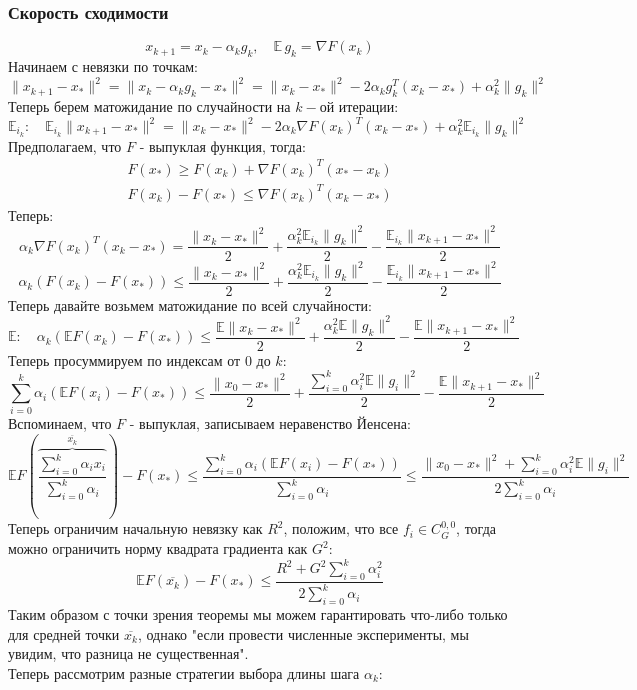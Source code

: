 \subsubsection{Скорость сходимости}
\[
    x_{k+1} = x_k - \alpha_k g_k, \quad \mathbb{E} \, g_k = \nabla F(x_k)
\]
Начинаем с невязки по точкам:
\[
    \| x_{k+1} - x_* \|^2 = \| x_k - \alpha_k g_k - x_* \|^2 = \| x_k - x_* \|^2 - 2\alpha_k g_k^T (x_k - x_*) + \alpha_k^2 \| g_k \|^2
\]
Теперь берем матожидание по случайности на $k-$ой итерации:
\[
    \mathbb{E}_{i_{k}} :\quad  \mathbb{E}_{i_{k}} \| x_{k+1} - x_* \|^2 = \| x_k - x_* \|^2 - 2\alpha_k \nabla F(x_k)^T (x_k - x_*) + \alpha_k^2 \mathbb{E}_{i_{k}} \| g_k \|^2
\]
Предполагаем, что $F$ - выпуклая функция, тогда:
\begin{gather*}
    F(x_*) \geq F(x_k) + \nabla F(x_k)^T (x_* - x_k) \\
    F(x_k) - F(x_*) \leq \nabla F(x_k)^T (x_k - x_*)
\end{gather*}
Теперь:
\[
    \alpha_k \nabla F(x_k)^T (x_k - x_*) = \dfrac{\| x_k - x_* \|^2}{2} + \dfrac{\alpha_k^2 \mathbb{E}_{i_{k}} \| g_k \|^2}{2} - \dfrac{\mathbb{E}_{i_{k}} \| x_{k+1} - x_* \|^2}{2}
\]
\[
    \alpha_k (F(x_k) - F(x_*)) \leq \dfrac{\| x_k - x_* \|^2}{2} + \dfrac{\alpha_k^2 \mathbb{E}_{i_{k}} \| g_k \|^2}{2} - \dfrac{\mathbb{E}_{i_{k}} \| x_{k+1} - x_* \|^2}{2}
\]
Теперь давайте возьмем матожидание по всей случайности:
\[
    \mathbb{E}: \quad \alpha_k (\mathbb{E} F(x_k) - F(x_*)) \leq \dfrac{\mathbb{E} \| x_k - x_* \|^2}{2} + \dfrac{\alpha_k^2 \mathbb{E} \| g_k \|^2}{2} - \dfrac{\mathbb{E} \| x_{k+1} - x_* \|^2}{2}
\]
Теперь просуммируем по индексам от $0$ до $k$:
\[
    \sum\limits_{i=0}^{k} \alpha_i (\mathbb{E} F(x_i) - F(x_*)) \leq \dfrac{\| x_0 - x_* \|^2}{2} + \dfrac{\sum\limits_{i=0}^{k} \alpha_i^2 \mathbb{E} \| g_i \|^2}{2} - \dfrac{\mathbb{E} \| x_{k+1} - x_* \|^2}{2}
\]
Вспоминаем, что $F$ - выпуклая, записываем неравенство Йенсена:
\[
    \mathbb{E} F\left(\overbrace{\dfrac{\sum\limits_{i=0}^{k} \alpha_i x_i}{\sum\limits_{i=0}^{k}\alpha_i}}^{\overline{x_k}}\right) - F(x_*) \leq \dfrac{\sum\limits_{i=0}^{k} \alpha_i (\mathbb{E} F(x_i) - F(x_*))}{\sum\limits_{i=0}^{k}\alpha_i} \leq \dfrac{\| x_0 - x_* \|^2 + \sum\limits_{i=0}^{k} \alpha_i^2 \mathbb{E} \| g_i \|^2}{2\sum\limits_{i=0}^{k}\alpha_i}
\]
Теперь ограничим начальную невязку как $R^2$, положим, что все $f_i \in C^{0, 0}_{G}$, тогда можно ограничить норму квадрата градиента как $G^2$:
\[
    \mathbb{E} F(\overline{x_k}) - F(x_*) \leq \dfrac{R^2 + G^2 \sum\limits_{i=0}^{k} \alpha_i^2}{2\sum\limits_{i=0}^{k}\alpha_i}
\]
Таким образом с точки зрения теоремы мы можем гарантировать что-либо только для средней точки $\overline{x_k}$, однако "если провести численные эксперименты, мы увидим, что разница не существенная". \\
Теперь рассмотрим разные стратегии выбора длины шага $\alpha_k$:

